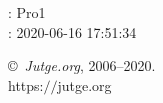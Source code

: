 \documentclass[11pt]{article}
\begin{document}
    \newcommand{\SampleTwoCol}{\SampleTwoColInputOutput{sample-000}{1}\SampleTwoColInputOutput{sample-001}{2}\SampleTwoColInputOutput{sample-002}{3}}
    \newcommand{\SampleOneCol}{\SampleOneColInputOutput{sample-000}{1}\SampleOneColInputOutput{sample-001}{2}\SampleOneColInputOutput{sample-002}{3}}

    \ProblemInformation
    \Author: Pro1\\    
    \Generation: 2020-06-16 17:51:34

    \bigskip

    \copyright\ \emph{Jutge.org}, 2006--2020. \\
    https:$/\!\!/$jutge.org
\end{document}
